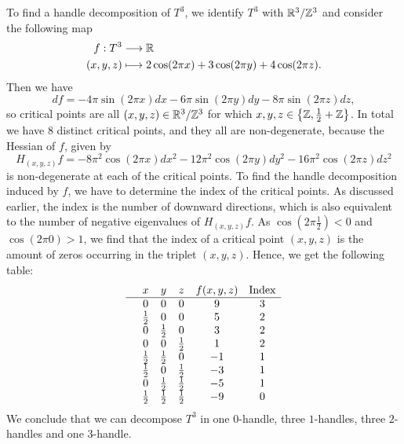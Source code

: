 \begin{eg}
\end{eg}
\begin{eg}[$T^{3} = S^{1} \times S^{1} \times S^{2}$]
    \label{eg:handle-decomposition-three-torus}
    To find a handle decomposition of $T^3$, we identify $T^{3}$ with $\mathbb{R}^3 / \mathbb{Z}^{3}$ and consider the following map
    \begin{align*}
        f: T^{3} &\longrightarrow \mathbb{R} \\
        (x, y, z) &\longmapsto 2\cos (2 \pi x) + 3\cos ( 2 \pi y) + 4 \cos(2 \pi z)
    .\end{align*}
    Then we have
    \[
        df =
        -4\pi \sin (2 \pi x) dx
        -6 \pi \sin ( 2 \pi y) dy
        - 8 \pi \sin(2 \pi z) dz
    ,\] 
    so critical points are all $(x, y, z) \in \mathbb{R}^3 / \mathbb{Z}^3$ for which  $x, y, z \in \left\{\mathbb{Z}, \frac{1}{2} + \mathbb{Z}\right\}$.
    In total we have $8$ distinct critical points, and they all are non-degenerate, because the Hessian of $f$, given by
    \[
        H_{(x, y, z)} f =
        - 8 \pi^2  \cos (2 \pi x) dx^2
        -12\pi^2 \cos ( 2 \pi y) dy^2
        -16 \pi^2 \cos(2 \pi z) dz^2
    \] 
    is non-degenerate at each of the critical points.
    To find the handle decomposition induced by $f$, we have to determine the index of the critical points.
    As discussed earlier, the index is the number of downward directions, which is also equivalent to the number of negative eigenvalues of $H_{(x, y, z)}f$.
    As $\cos(2 \pi \frac{1}{2}) < 0$ and $\cos(2 \pi 0) > 1$, we find that the index of a critical point $(x, y, z)$ is the amount of zeros occurring in the triplet $(x, y, z)$. Hence, we get the following table:
    \[\begin{array}{cccccc}
  & x & y  & z & f(x, y, z) & \text{Index}\\ \hline
  & 0 & 0 & 0 & 9 & 3 \\
& \frac{1}{2} & 0 & 0 & 5 & 2 \\
& 0 & \frac{1}{2} & 0 & 3 & 2 \\
& 0 & 0 & \frac{1}{2} & 1 & 2 \\
& \frac{1}{2} & \frac{1}{2} & 0 & -1 & 1 \\
& \frac{1}{2} & 0 & \frac{1}{2} & -3 & 1 \\
& 0 & \frac{1}{2} & \frac{1}{2} & -5 & 1 \\
& \frac{1}{2} & \frac{1}{2} & \frac{1}{2} & -9 & 0 \\
    \end{array}\]
    We conclude that we can decompose $T^3$ in one $0$-handle, three $1$-handles, three $2$-handles and one $3$-handle.


\end{eg}
